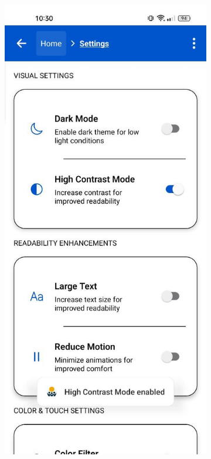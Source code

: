 \begin{enumerate}
\begin{figure}[ht]
    \centering
    \begin{subfigure}[b]{0.48\textwidth}
        \centering
        \includegraphics[width=\linewidth, alt={Settings screen with dark mode enabled}]{img/settings1.jpg}

\end{subfigure}
\end{figure}
\end{enumerate}

